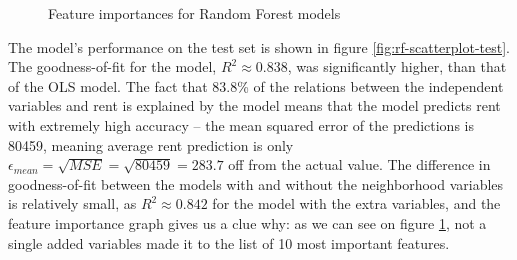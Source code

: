 \documentclass[12pt]{report}
\begin{document}
\begin{figure}[h]
	\caption{Feature importances for Random Forest models}
	\label{fig:rf-importances}
\end{figure}

The model's performance on the test set is shown in figure \ref{fig:rf-scatterplot-test}. The goodness-of-fit for the model, $R^2\approx0.838$, was significantly higher, than that of the OLS model. The fact that 83.8\% of the relations between the independent variables and rent is explained by the model means that the model predicts rent with extremely high accuracy -- the mean squared error of the predictions is 80459, meaning average rent prediction is only $\epsilon_{mean}=\sqrt{MSE}=\sqrt{80459}=283.7$ off from the actual value. The difference in goodness-of-fit between the models with and without the neighborhood variables is relatively small, as $R^2\approx0.842$ for the model with the extra variables, and the feature importance graph gives us a clue why: as we can see on figure \ref{fig:rf-importances}, not a single added variables made it to the list of 10 most important features.
\end{document}
